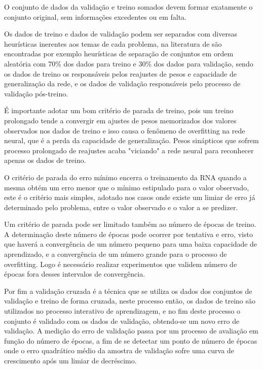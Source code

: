             	O conjunto de dados da validação e treino somados devem formar exatamente o conjunto original, sem informações excedentes ou em falta.
            	
            	Os dados de treino e dados de validação podem ser separados com diversas heurísticas inerentes aos temas de cada problema, na literatura de \cite{DLB} são encontradas por exemplo heurísticas de separação de conjuntos em ordem aleatória com 70\% dos dados para treino e 30\% dos dados para validação, sendo os dados de treino os responsáveis pelos reajustes de pesos e capacidade de generalização da rede, e os dados de validação responsáveis pelo processo de validação pós-treino.
            	
            	É importante adotar um bom critério de parada de treino, pois um treino prolongado tende a convergir em ajustes de pesos memorizados dos valores observados nos dados de treino e isso causa o fenômeno de overfitting na rede neural, que é a perda da capacidade de generalização. Pesos sinápticos que sofrem processo prolongado de reajustes acaba "viciando" a rede neural para reconhecer apenas os dados de treino.
            	
            	O critério de parada do erro mínimo encerra o treinamento da RNA quando a mesma obtém um erro menor que o mínimo estipulado para o valor observado, este é o critério mais simples, adotado nos casos onde existe um limiar de erro já determinado pelo problema, entre o valor observado e o valor a se predizer.
            	
            	Um critério de parada pode ser limitado também ao número de épocas de treino. A determinação  deste número de épocas pode ocorrer por tentativa e erro, visto que haverá a convergência de um número pequeno para uma baixa capacidade de aprendizado, e a convergência de um número grande para o processo de overfitting. Logo é necessário realizar experimentos que validem número de épocas fora desses intervalos de convergência.
            	
            	Por fim a validação cruzada é a técnica que se utiliza os dados dos conjuntos de validação e treino de forma cruzada, neste processo então, os dados de treino são utilizados no processo interativo de aprendizagem, e no fim deste processo o conjunto é validado com os dados de validação, obtendo-se um novo erro de validação.
            	A medição do erro de validação passa por um processo de avaliação em função do número de épocas, a fim de se detectar um ponto de número de épocas onde o erro quadrático médio da amostra de validação sofre uma curva de crescimento após um limiar de decréscimo.
            	
